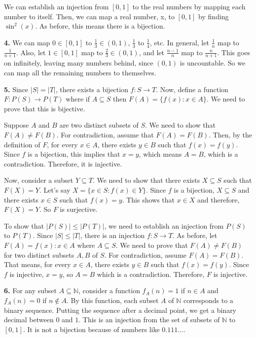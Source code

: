 \documentclass{article}
\begin{document}
We can establish an injection from $[0, 1]$ to the real numbers by mapping each number to itself. Then, we can map a real number, x, to $[0, 1]$ by finding $\sin^2(x)$. As before, this means there is a bijection.

\textbf{4.} We can map $0 \in [0, 1]$ to $\frac{1}{3} \in (0, 1)$, $\frac{1}{3}$ to $\frac{1}{4}$, etc. In general, let $\frac{1}{n}$ map to $\frac{1}{n + 1}$. Also, let $1 \in [0, 1]$ map to $\frac{2}{3} \in (0, 1)$, and let $\frac{n - 1}{n}$ map to $\frac{n}{n + 1}$. This goes on infinitely, leaving many numbers behind, since $(0, 1)$ is uncountable. So we can map all the remaining numbers to themselves.
\newline

\textbf{5.} Since $|S| = |T|$, there exists a bijection $f: S \rightarrow T$. Now, define a function $F: P(S) \rightarrow P(T)$ where if $A \subseteq S$ then $F(A) = \{f(x): x \in A\}$. We need to prove that this is bijective.
\newline

Suppose $A$ and $B$ are two distinct subsets of $S$. We need to show that $F(A) \neq F(B)$. For contradiction, assume that $F(A) = F(B)$. Then, by the definition of $F$, for every $x \in A$, there exists $y \in B$ such that $f(x) = f(y)$. Since $f$ is a bijection, this implies that $x = y$, which means $A = B$, which is a contradiction. Therefore, it is injective.
\newline

Now, consider a subset $Y \subseteq T$. We need to show that there exists $X \subseteq S$ such that $F(X) = Y$. Let's say $X = \{x \in S: f(x) \in Y\}$. Since $f$ is a bijection, $X \subseteq S$ and there exists $x \in S$ such that $f(x) = y$. This shows that $x \in X$ and therefore, $F(X) = Y$. So $F$ is surjective.
\newline

To show that $|P(S)| \le |P(T)|$, we need to establish an injection from $P(S)$ to $P(T)$. Since $|S| \le |T|$, there is an injection $f: S \rightarrow T$. As before, let $F(A) = {f(x): x \in A}$ where $A \subseteq S$. We need to prove that $F(A) \neq F(B)$ for two distinct subsets $A, B$ of $S$. For contradiction, assume $F(A) = F(B)$. That means, for every $x \in A$, there exists $y \in B$ such that $f(x) = f(y)$. Since $f$ is injective, $x = y$, so $A = B$ which is a contradiction. Therefore, $F$ is injective.
\newline

\textbf{6.} For any subset $A \subseteq \mathbb{N}$, consider a function $f_A(n) = 1$ if $n \in A$ and $f_A(n) = 0$ if $n \not \in A$. By this function, each subset $A$ of $\mathbb{N}$ corresponds to a binary sequence. Putting the sequence after a decimal point, we get a binary decimal between $0$ and $1$. This is an injection from the set of subsets of $\mathbb{N}$ to $[0, 1]$. It is not a bijection because of numbers like $0.111...$.
\newline
\end{document}
